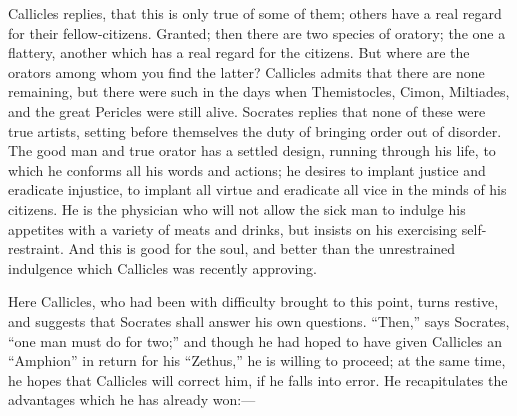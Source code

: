 \documentclass[11pt,letter]{article}
\begin{document}
\par  Callicles replies, that this is only true of some of them; others have a real regard for their fellow-citizens. Granted; then there are two species of oratory; the one a flattery, another which has a real regard for the citizens. But where are the orators among whom you find the latter? Callicles admits that there are none remaining, but there were such in the days when Themistocles, Cimon, Miltiades, and the great Pericles were still alive. Socrates replies that none of these were true artists, setting before themselves the duty of bringing order out of disorder. The good man and true orator has a settled design, running through his life, to which he conforms all his words and actions; he desires to implant justice and eradicate injustice, to implant all virtue and eradicate all vice in the minds of his citizens. He is the physician who will not allow the sick man to indulge his appetites with a variety of meats and drinks, but insists on his exercising self-restraint. And this is good for the soul, and better than the unrestrained indulgence which Callicles was recently approving.

\par  Here Callicles, who had been with difficulty brought to this point, turns restive, and suggests that Socrates shall answer his own questions. “Then,” says Socrates, “one man must do for two;” and though he had hoped to have given Callicles an “Amphion” in return for his “Zethus,” he is willing to proceed; at the same time, he hopes that Callicles will correct him, if he falls into error. He recapitulates the advantages which he has already won:—
\end{document}
